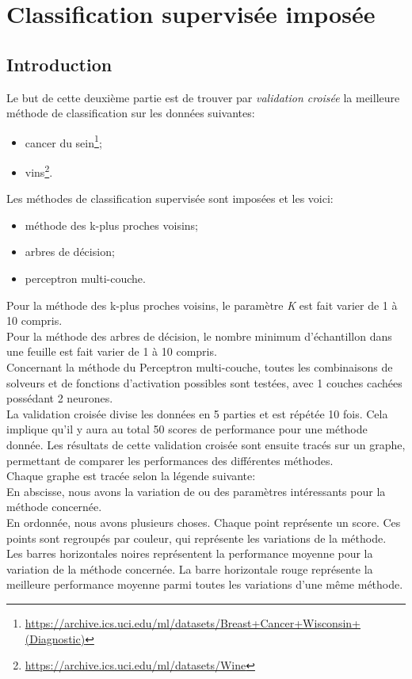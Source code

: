 \documentclass[11pt, a4paper]{article}
\begin{document}
\section{Classification supervisée imposée}
\subsection{Introduction}
\label{part2}

Le but de cette deuxième partie est de trouver par \textit{validation croisée}
la meilleure méthode de classification sur les données suivantes:
\begin{itemize}
    \item cancer du sein\footnote{\url{https://archive.ics.uci.edu/ml/datasets/Breast+Cancer+Wisconsin+(Diagnostic)}};
    \item vins\footnote{\url{https://archive.ics.uci.edu/ml/datasets/Wine}}. \\
\end{itemize}

Les méthodes de classification supervisée sont imposées et les voici:
\begin{itemize}
    \item méthode des k-plus proches voisins;
    \item arbres de décision;
    \item perceptron multi-couche. \\
\end{itemize}

Pour la méthode des k-plus proches voisins, le paramètre \textit{K} est fait varier de 1 à 10 compris. \\
Pour la méthode des arbres de décision,
le nombre minimum d'échantillon dans une feuille est fait varier de 1 à 10 compris. \\
Concernant la méthode du Perceptron multi-couche,
toutes les combinaisons de solveurs et de fonctions d'activation possibles sont testées,
avec 1 couches cachées possédant 2 neurones. \\

La validation croisée divise les données en 5 parties et est répétée 10 fois.
Cela implique qu'il y aura au total 50 scores de performance pour une méthode donnée.
Les résultats de cette validation croisée sont ensuite tracés sur un graphe,
permettant de comparer les performances des différentes méthodes. \\

Chaque graphe est tracée selon la légende suivante: \\
En abscisse, nous avons la variation de ou des paramètres intéressants pour la méthode concernée. \\
En ordonnée, nous avons plusieurs choses.
Chaque point représente un score.
Ces points sont regroupés par couleur, qui représente les variations de la méthode.
Les barres horizontales noires représentent la performance moyenne pour la variation de la méthode concernée.
La barre horizontale rouge représente la meilleure performance moyenne parmi toutes les variations d'une même méthode. \\
\end{document}
